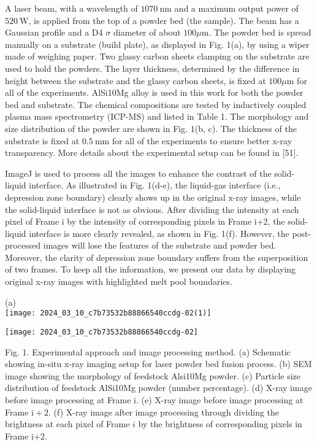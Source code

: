 \documentclass[10pt]{article}
\begin{document}
A laser beam, with a wavelength of $1070 \mathrm{~nm}$ and a maximum output power of $520 \mathrm{~W}$, is applied from the top of a powder bed (the sample). The beam has a Gaussian profile and a D4 $\sigma$ diameter of about $100 \mu \mathrm{m}$. The powder bed is spread manually on a substrate (build plate), as displayed in Fig. 1(a), by using a wiper made of weighing paper. Two glassy carbon sheets clamping on the substrate are used to hold the powders. The layer thickness, determined by the difference in height between the substrate and the glassy carbon sheets, is fixed at $100 \mu \mathrm{m}$ for all of the experiments. AlSi10Mg alloy is used in this work for both the powder bed and substrate. The chemical compositions are tested by inductively coupled plasma mass spectrometry (ICP-MS) and listed in Table 1. The morphology and size distribution of the powder are shown in Fig. 1(b, c). The thickness of the substrate is fixed at $0.5 \mathrm{~mm}$ for all of the experiments to ensure better x-ray transparency. More details about the experimental setup can be found in [51].

ImageJ is used to process all the images to enhance the contrast of the solid-liquid interface. As illustrated in Fig. 1(d-e), the liquid-gas interface (i.e., depression zone boundary) clearly shows up in the original $\mathrm{x}$-ray images, while the solid-liquid interface is not as obvious. After dividing the intensity at each pixel of Frame i by the intensity of corresponding pixels in Frame i+2, the solid-liquid interface is more clearly revealed, as shown in Fig. 1(f). However, the post-processed images will lose the features of the substrate and powder bed. Moreover, the clarity of depression zone boundary suffers from the superposition of two frames. To keep all the information, we present our data by displaying original x-ray images with highlighted melt pool boundaries.

(a)\\
\texttt{[image: 2024\_03\_10\_c7b73532b88866540ccdg-02(1)]}

\begin{center}
\texttt{[image: 2024\_03\_10\_c7b73532b88866540ccdg-02]}
\end{center}

Fig. 1. Experimental approach and image processing method. (a) Schematic showing in-situ x-ray imaging setup for laser powder bed fusion process. (b) SEM image showing the morphology of feedstock Alsi10Mg powder. (c) Particle size distribution of feedstock AlSi10Mg powder (number percentage). (d) X-ray image before image processing at Frame i. (e) X-ray image before image processing at Frame $\mathrm{i}+2$. (f) X-ray image after image processing through dividing the brightness at each pixel of Frame $i$ by the brightness of corresponding pixels in Frame i+2.
\end{document}
